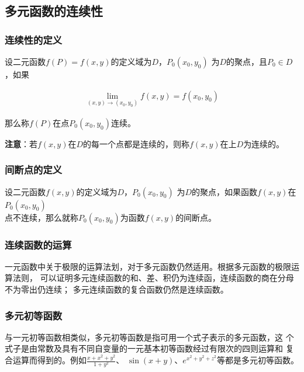 \documentclass[12pt, a4paper]{article}
\numberwithin{equation}{section}
\begin{document}
\subsection{多元函数的连续性}

\subsubsection{连续性的定义}

    设二元函数\(f\left(P\right) = f\left(x,y\right)\)的定义域为\(D\)，\(P_0\left(x_0,y_0\right)\)
    为\(D\)的聚点，且\(P_0 \in D\)，如果

    \begin{align}
        \lim_{\left(x,y\right) \rightarrow \left(x_0,y_0\right)}f\left(x,y\right) = f\left(x_0,y_0\right)
    \end{align}

    那么称\(f\left(P\right)\)在点\(P_0\left(x_0,y_0\right)\)连续。

    \textbf{注意}：若\(f\left(x,y\right)\)在\(D\)的每一个点都是连续的，则称\(f\left(x,y\right)\)在上\(D\)为连续的。

\subsubsection{间断点的定义}

    设二元函数\(f\left(x,y\right)\)的定义域为\(D\)，\(P_0\left(x_0,y_0\right)\)
    为\(D\)的聚点，如果函数\(f\left(x,y\right)\)在\(P_0\left(x_0,y_0\right)\)\\
    点不连续，那么就称\(P_0\left(x_0,y_0\right)\)为函数\(f\left(x,y\right)\)的间断点。

\subsubsection{连续函数的运算}

    一元函数中关于极限的运算法划，对于多元函数仍然适用。根据多元函数的极限运算法则，
    可以证明多元连续函数的和、差、积仍为连续函，连续函数的商在分母不为零出仍连续；
    多元连续函数的复合函数仍然是连续函数。

\subsubsection{多元初等函数}

    与一元初等函数相类似，多元初等函数是指可用一个式子表示的多元函数，这
    个式子是由常数及具有不同自变量的一元基本初等函数经过有限次的四则运算和
    复合运算而得到的。例如\(\frac{x + x^2 + y^2}{1+y^2}\)、
    \(\sin\left(x+y\right)\)、\(e^{x^2 + y^2 + z^2}\)等都是多元初等函数。
    
\end{document}
